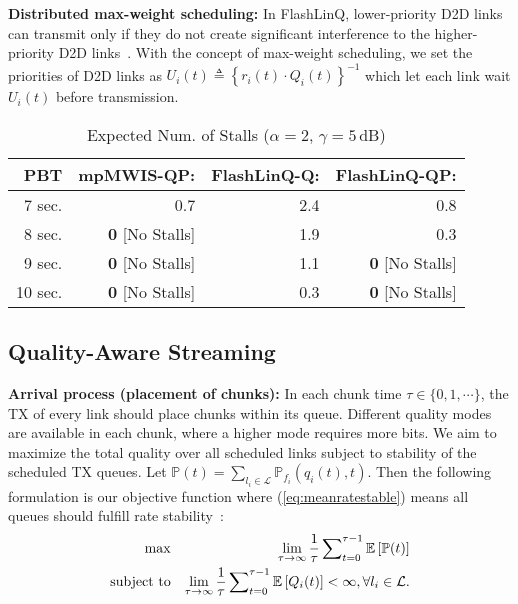 \documentclass[journal]{IEEEtran}
\begin{document}
\textbf{Distributed max-weight scheduling:}
In FlashLinQ, lower-priority D2D links can transmit only if they do not create significant interference to the higher-priority D2D links~\cite{ton2013wu}.
With the concept of max-weight scheduling, we set the priorities of D2D links as
$U_{i}(t) \triangleq \left\{r_{i}(t)\cdot Q_{i}(t)\right\}^{-1}$
which let each link wait $U_{i}(t)$ before transmission.


\begin{table}[t!]{\footnotesize
\caption{Expected Num. of Stalls ($\alpha=2$, $\gamma=5$\,dB)}
\label{tbl-prebuffering2}
    \centering \begin{tabular}{r||r|r|r}
    \hline\hline
    PBT
    & mpMWIS-QP:
    & FlashLinQ-Q:
    & FlashLinQ-QP: \\
	\hline
     7 sec. &   0.7 &  2.4 &  0.8 \\
     8 sec. &   \textbf{0} [No Stalls] &  1.9 &  0.3 \\
     9 sec. &   \textbf{0} [No Stalls] &  1.1 &  \textbf{0} [No Stalls] \\
    10 sec. &   \textbf{0} [No Stalls] &  0.3 &  \textbf{0} [No Stalls] \\
	\hline\hline
	\end{tabular}
}
\end{table}


 \vspace{-2.5mm}
\subsection{Quality-Aware Streaming}\label{sec:streaming}

\textbf{Arrival process (placement of chunks):}
In each chunk time $\tau \in\{0,1,\cdots\}$, the TX of every link should place chunks within its queue. Different quality modes are available in each chunk, where a higher mode requires more bits.
We aim to maximize the total quality over all scheduled links subject to stability of the scheduled TX queues.
Let $\mathbb{P}(t) = \sum_{l_{i}\in\mathcal{L}}\mathbb{P}_{f_{i}}\left(q_{i}(t),t\right)$.
Then the following formulation is our objective function where (\ref{eq:meanratestable}) means all queues should fulfill rate stability~\cite{asilomar2012bethanabhotla}:
\begin{eqnarray}
\max & & \lim_{\tau\rightarrow \infty}\frac{1}{\tau}\sum_{t=0}^{\tau-1}\nolimits \mathbb{E}\left[\mathbb{P}(t)\right]\\
\text{subject to} & & \lim_{\tau\rightarrow \infty}\frac{1}{\tau}\sum_{t=0}^{\tau-1}\nolimits \mathbb{E}\left[Q_{i}(t)\right] < \infty, \forall l_{i} \in\mathcal{L}.\label{eq:meanratestable}
\end{eqnarray}
\end{document}
